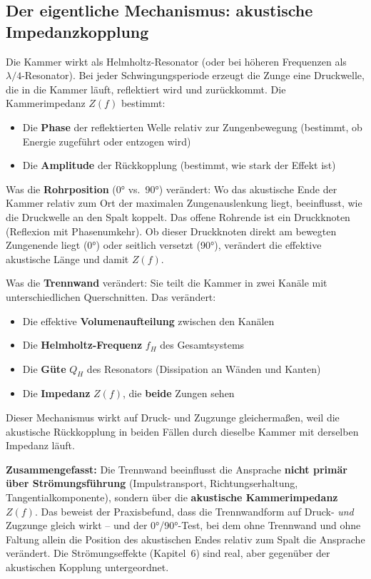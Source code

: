 \documentclass[11pt,a4paper]{article}
\begin{document}
\subsection{Der eigentliche Mechanismus: akustische Impedanzkopplung}

Die Kammer wirkt als Helmholtz-Resonator (oder bei höheren Frequenzen als $\lambda/4$-Resonator). Bei jeder Schwingungsperiode erzeugt die Zunge eine Druckwelle, die in die Kammer läuft, reflektiert wird und zurückkommt. Die Kammerimpedanz $Z(f)$ bestimmt:

\begin{itemize}[leftmargin=5mm, itemsep=1pt]
\item Die \textbf{Phase} der reflektierten Welle relativ zur Zungenbewegung (bestimmt, ob Energie zugeführt oder entzogen wird)
\item Die \textbf{Amplitude} der Rückkopplung (bestimmt, wie stark der Effekt ist)
\end{itemize}

Was die \textbf{Rohrposition} (0° vs.\ 90°) verändert: Wo das akustische \glqq{}Ende\grqq{} der Kammer relativ zum Ort der maximalen Zungenauslenkung liegt, beeinflusst, wie die Druckwelle an den Spalt koppelt. Das offene Rohrende ist ein Druckknoten (Reflexion mit Phasenumkehr). Ob dieser Druckknoten direkt am bewegten Zungenende liegt (0°) oder seitlich versetzt (90°), verändert die effektive akustische Länge und damit $Z(f)$.

Was die \textbf{Trennwand} verändert: Sie teilt die Kammer in zwei Kanäle mit unterschiedlichen Querschnitten. Das verändert:
\begin{itemize}[leftmargin=5mm, itemsep=1pt]
\item Die effektive \textbf{Volumenaufteilung} zwischen den Kanälen
\item Die \textbf{Helmholtz-Frequenz} $f_H$ des Gesamtsystems
\item Die \textbf{Güte} $Q_H$ des Resonators (Dissipation an Wänden und Kanten)
\item Die \textbf{Impedanz} $Z(f)$, die \textbf{beide} Zungen sehen
\end{itemize}

Dieser Mechanismus wirkt auf Druck- und Zugzunge gleichermaßen, weil die akustische Rückkopplung in beiden Fällen durch dieselbe Kammer mit derselben Impedanz läuft.

\begin{keybox}
\textbf{Zusammengefasst:} Die Trennwand beeinflusst die Ansprache \textbf{nicht primär über Strömungsführung} (Impulstransport, Richtungserhaltung, Tangentialkomponente), sondern über die \textbf{akustische Kammerimpedanz} $Z(f)$. Das beweist der Praxisbefund, dass die Trennwandform auf Druck- \textit{und} Zugzunge gleich wirkt -- und der 0°/90°-Test, bei dem ohne Trennwand und ohne Faltung allein die Position des akustischen Endes relativ zum Spalt die Ansprache verändert. Die Strömungseffekte (Kapitel~6) sind real, aber gegenüber der akustischen Kopplung untergeordnet.
\end{keybox}
\end{document}
